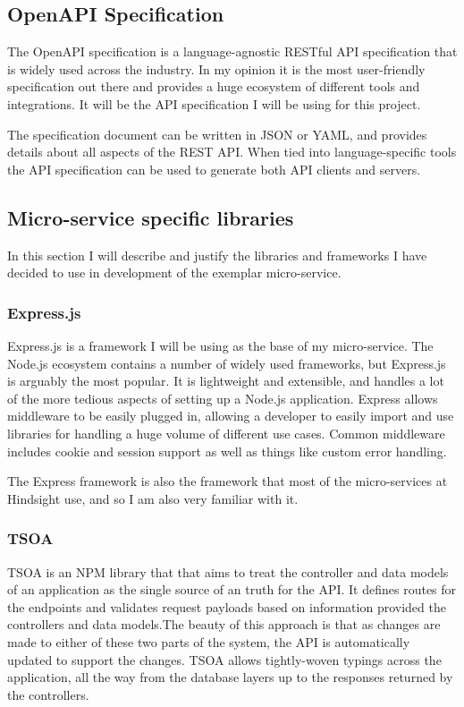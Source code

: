 \subsection{OpenAPI Specification}
The OpenAPI specification is a language-agnostic RESTful API specification that is widely used across the industry. In my opinion it is the most user-friendly specification out there and provides a huge ecosystem of different tools and integrations. It will be the API specification I will be using for this project. 

The specification document can be written in JSON or YAML, and provides details about all aspects of the REST API. When tied into language-specific tools the API specification can be used to generate both API clients and servers.
\subsection{Micro-service specific libraries}

In this section I will describe and justify the libraries and frameworks I have decided to use in development of the exemplar micro-service.

\subsubsection{Express.js}
Express.js is a framework I will be using as the base of my micro-service. The Node.js ecosystem contains a number of widely used frameworks, but Express.js is arguably the most popular. It is lightweight and extensible, and handles a lot of the more tedious aspects of setting up a Node.js application. Express allows middleware to be easily plugged in, allowing a developer to easily import and use libraries for handling a huge volume of different use cases. Common middleware includes cookie and session support as well as things like custom error handling.

The Express framework is also the framework that most of the micro-services at Hindsight use, and so I am also very familiar with it.
\subsubsection{TSOA}
TSOA is an NPM library that that aims to treat the controller and data models of an application as the single source of an truth for the API. It defines routes for the endpoints and validates request payloads based on information provided the controllers and data models.The beauty of this approach is that as changes are made to either of these two parts of the system, the API is automatically updated to support the changes. TSOA allows tightly-woven typings across the application, all the way from the database layers up to the responses returned by the controllers.

